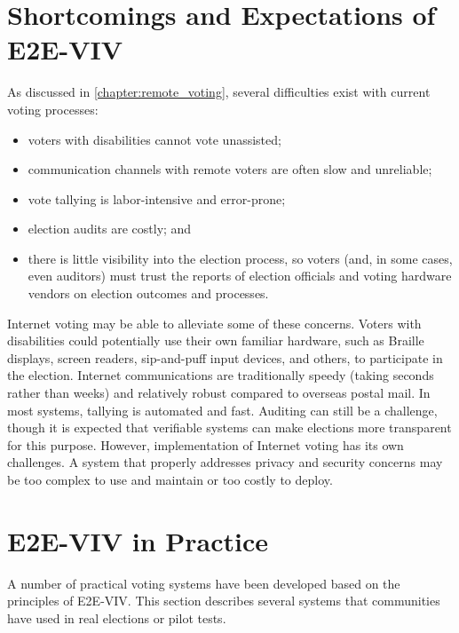 \section{Shortcomings and Expectations of E2E-VIV}

As discussed in \autoref{chapter:remote_voting}, several difficulties
exist with current voting processes:

\begin{itemize}
\item voters with disabilities cannot vote unassisted; 
\item communication channels with remote voters are often slow and
  unreliable;
\item vote tallying is labor-intensive and error-prone; 
\item election audits are costly; and
\item there is little visibility into the election process, so voters
  (and, in some cases, even auditors) must trust the reports of
  election officials and voting hardware vendors on election outcomes
  and processes.
\end{itemize}

Internet voting may be able to alleviate some of these
concerns. Voters with disabilities could potentially use their own
familiar hardware, such as Braille displays, screen readers,
sip-and-puff input devices, and others, to participate in the
election. Internet communications are traditionally speedy (taking
seconds rather than weeks) and relatively robust compared to overseas
postal mail. In most systems, tallying is automated and fast. Auditing
can still be a challenge, though it is expected that verifiable
systems can make elections more transparent for this purpose. However,
implementation of Internet voting has its own challenges. A system
that properly addresses privacy and security concerns may be too
complex to use and maintain or too costly to deploy.

\section{E2E-VIV in Practice}

A number of practical voting systems have been developed based on the
principles of E2E-VIV. This section describes several systems that
communities have used in real elections or pilot tests.

